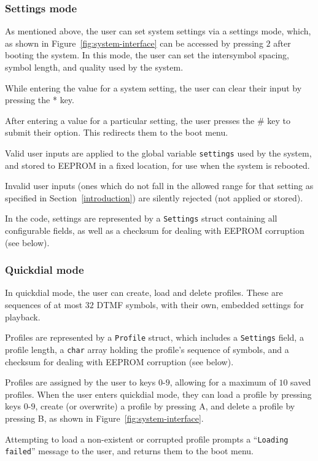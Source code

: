 \documentclass[11pt,a4paper,twocolumn]{scrartcl}
\begin{document}
\subsubsection{Settings mode}

As mentioned above, the user can set system settings via a settings mode, which, as shown in Figure~\ref{fig:system-interface} can be accessed by pressing $2$ after booting the system. In this mode, the user can set the intersymbol spacing, symbol length, and quality used by the system.

While entering the value for a system setting, the user can clear their input by pressing the * key.

After entering a value for a particular setting, the user presses the \# key to submit their option. This redirects them to the boot menu. 

Valid user inputs are applied to the global variable \verb!settings! used by the system, and stored to EEPROM in a fixed location, for use when the system is rebooted. 

Invalid user inputs (ones which do not fall in the allowed range for that setting as specified in Section~\ref{introduction}) are silently rejected (not applied or stored).

In the code, settings are represented by a \verb!Settings! struct containing all configurable fields, as well as a checksum for dealing with EEPROM corruption (see below).

\subsubsection{Quickdial mode}

In quickdial mode, the user can create, load and delete profiles. These are sequences of at most $32$ DTMF symbols, with their own, embedded settings for playback. 

Profiles are represented by a \verb!Profile! struct, which includes a \verb!Settings! field, a profile length, a \verb!char! array holding the profile's sequence of symbols, and a checksum for dealing with EEPROM corruption (see below).

Profiles are assigned by the user to keys $0$-$9$, allowing for a maximum of $10$ saved profiles. When the user enters quickdial mode, they can load a profile by pressing keys $0$-$9$, create (or overwrite) a profile by pressing A, and delete a profile by pressing B, as shown in Figure~\ref{fig:system-interface}.

Attempting to load a non-existent or corrupted profile prompts a ``\verb!Loading failed!'' message to the user, and returns them to the boot menu. 
\end{document}
